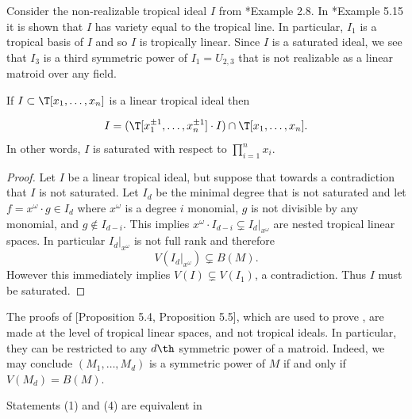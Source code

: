 \begin{example}\label{ex:nonrealizableSymprod}
Consider the non-realizable tropical ideal $I$ from \cite{MR16}*{Example 2.8}. In \cite{MR16}*{Example 5.15} it is shown that $I$ has variety equal to the tropical line. In particular, $I_1$ is a tropical basis of $I$ and so $I$ is tropically linear. Since $I$ is a saturated ideal, we see that $I_3$ is a third symmetric power of $I_1=U_{2,3}$ that is not realizable as a linear matroid over any field.
\end{example}

\begin{corollary}\label{cor:LTIsaturated}
If $I\subset \T[x_1,\dots,x_n]$ is a linear tropical ideal then

$$I = (\T[x_1^{\pm1},\dots,x_n^{\pm1}]\cdot I )\cap \T[x_1,\dots,x_n].$$
In other words, $I$ is saturated with respect to $\prod_{i=1}^n x_i$. 
\end{corollary}
\begin{proof}
Let $I$ be a linear tropical ideal, but suppose that towards a contradiction that $I$ is not saturated. Let $I_d$ be the minimal degree that is not saturated and let $f= x^\omega \cdot g\in I_d$ where $x^\omega$ is a degree $i$ monomial, $g$ is not divisible by any monomial, and $g\notin I_{d-i}$. This implies $x^\omega\cdot I_{d-i}\subsetneq I_d|_{x^\omega}$ are nested tropical linear spaces. In particular $I_d|_{x^\omega}$ is not full rank and therefore $$V(I_d|_{x^\omega})\subsetneq B(M).$$
However this immediately implies $V(I)\subsetneq V(I_1)$, a contradiction. Thus $I$ must be saturated.
\end{proof}

\begin{remark}\label{rem:bfCharacterisation}
The proofs of \cite{DR19}[Proposition 5.4, Proposition 5.5], which are used to prove , are made at the level of tropical linear spaces, and not tropical ideals. In particular, they can be restricted to any $d\th$ symmetric power of a matroid. Indeed, we may conclude $(M_1,\dots,M_d)$ is a symmetric power of $M$ if and only if $V(M_d)= B(M)$. 
\end{remark}

\begin{corollary}\label{cor:bfCharacterisation}
Statements (1) and (4) are equivalent in 
\end{corollary}

